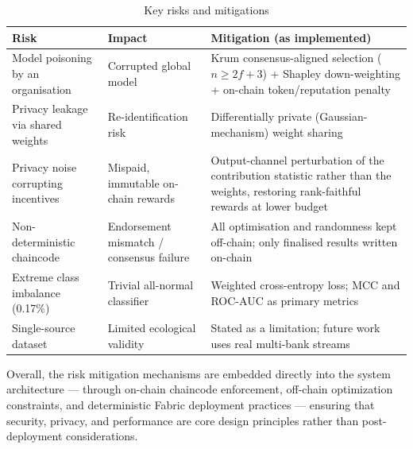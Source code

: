 \begin{table}[!htbp]
\centering
\caption{Key risks and mitigations}
\label{tab:risk_management}
\begin{tabular}{p{4cm}p{4.5cm}p{5.5cm}}
\toprule
\textbf{Risk} & \textbf{Impact} & \textbf{Mitigation (as implemented)} \\
\midrule
Model poisoning by an organisation & Corrupted global model & Krum consensus-aligned selection ($n\ge 2f+3$) + Shapley down-weighting + on-chain token/reputation penalty \\
\midrule
Privacy leakage via shared weights & Re-identification risk & Differentially private (Gaussian-mechanism) weight sharing \\
\midrule
Privacy noise corrupting incentives & Mispaid, immutable on-chain rewards & Output-channel perturbation of the contribution statistic rather than the weights, restoring rank-faithful rewards at lower budget \\
\midrule
Non-deterministic chaincode & Endorsement mismatch / consensus failure & All optimisation and randomness kept off-chain; only finalised results written on-chain \\
\midrule
Extreme class imbalance (0.17\%) & Trivial all-normal classifier & Weighted cross-entropy loss; MCC and ROC-AUC as primary metrics \\
\midrule
Single-source dataset & Limited ecological validity & Stated as a limitation; future work uses real multi-bank streams \\
\bottomrule
\end{tabular}
\end{table}

Overall, the risk mitigation mechanisms are embedded directly into the system architecture — through on-chain chaincode enforcement, off-chain optimization constraints, and deterministic Fabric deployment practices — ensuring that security, privacy, and performance are core design principles rather than post-deployment considerations.

